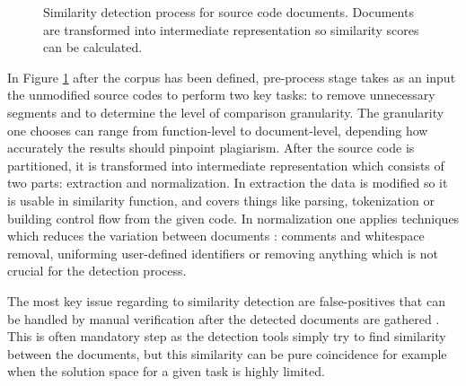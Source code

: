 \begin{figure}[!ht]
\centering
\vspace{0.5cm}
\caption{Similarity detection process for source code documents. Documents are transformed into intermediate representation so similarity scores can be calculated.}
\label{fig-sd-flow}
\end{figure}

\noindent
In Figure \ref{fig-sd-flow} after the corpus has been defined, pre-process stage takes as an input the unmodified source codes to perform two key tasks: to remove unnecessary segments and to determine the level of comparison granularity. The granularity one chooses can range from function-level to document-level, depending how accurately the results should pinpoint plagiarism. After the source code is partitioned, it is transformed into intermediate representation which consists of two parts: extraction and normalization. In extraction the data is modified so it is usable in similarity function, and covers things like parsing, tokenization or building control flow from the given code. In normalization one applies techniques which reduces the variation between documents \cite{Roy:2009:CEC:1530898.1531101}: comments and whitespace removal, uniforming user-defined identifiers or removing anything which is not crucial for the detection process.

The most key issue regarding to similarity detection are false-positives that can be handled by manual verification after the detected documents are gathered \cite{ Roy:2009:CEC:1530898.1531101, Verco:1996:SDS:369585.369598}. This is often mandatory step as the detection tools simply try to find similarity between the documents, but this similarity can be pure coincidence for example when the solution space for a given task is highly limited. 




